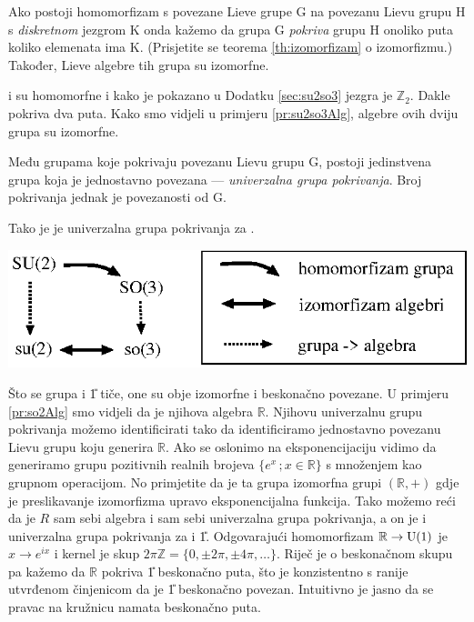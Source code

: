 Ako postoji homomorfizam s povezane Lieve grupe G na povezanu Lievu
grupu H s \emph{diskretnom} jezgrom K onda kažemo da grupa G 
\emph{pokriva} grupu H onoliko puta koliko elemenata ima K.
(Prisjetite se teorema \ref{th:izomorfizam} o izomorfizmu.)
Također, Lieve algebre tih grupa su izomorfne.

\begin{primjer}[\SO{3} i \SU{2}]
 i  su homomorfne i kako je pokazano u Dodatku \ref{sec:su2so3} 
jezgra je $\mathbb{Z}_2$. Dakle  pokriva  dva puta.
Kako smo vidjeli u primjeru \ref{pr:su2so3Alg}, algebre ovih
dviju grupa su izomorfne.
\end{primjer}

\begin{teorem}
Među grupama koje pokrivaju povezanu Lievu grupu G, postoji jedinstvena
grupa koja je jednostavno povezana --- \emph{univerzalna grupa pokrivanja}.
Broj pokrivanja jednak je povezanosti od G. 
\end{teorem}


Tako je  je univerzalna grupa pokrivanja za .

\centerline{\includegraphics[scale=1.0]{pics/so3pokrivanje.eps}}

Što se grupa  i \U{1} tiče, one su obje izomorfne i beskonačno
povezane. U primjeru \ref{pr:so2Alg} smo vidjeli da je njihova
algebra $\mathbb{R}$.
Njihovu univerzalnu grupu pokrivanja možemo identificirati
tako da identificiramo jednostavno povezanu Lievu grupu koju
generira $\mathbb{R}$. Ako se oslonimo na eksponencijaciju
vidimo da generiramo grupu pozitivnih realnih brojeva
$\{e^{x}\,; x \in \mathbb{R}\}$ s množenjem kao grupnom operacijom.
No primjetite da je ta grupa izomorfna grupi $(\mathbb{R}, +)$
gdje je preslikavanje izomorfizma upravo eksponencijalna funkcija.
Tako možemo reći da je $R$ sam sebi algebra i sam sebi univerzalna
grupa pokrivanja, a on je i univerzalna grupa pokrivanja za
 i \U{1}. Odgovarajući homomorfizam $\mathbb{R} \to \mathrm{U}(1)$
je $x \to e^{ix}$ i kernel je skup $2\pi\mathbb{Z} = \{0, \pm 2\pi,
\pm 4\pi, \ldots\}$. Riječ je o beskonačnom skupu pa kažemo da
$\mathbb{R}$ pokriva \U{1} beskonačno puta, što je konzistentno
s ranije utvrđenom činjenicom da je \U{1} beskonačno povezan.
Intuitivno je jasno da se pravac na kružnicu namata beskonačno
puta.


